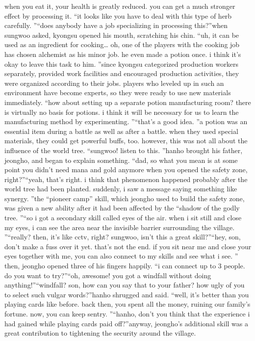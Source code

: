  when you eat it, your health is greatly reduced.
 you can get a much stronger effect by processing it.
“it looks like you have to deal with this type of herb carefully.
”“does anybody have a job specializing in processing this?”when sungwoo asked, kyongsu opened his mouth, scratching his chin.
“uh, it can be used as an ingredient for cooking… oh, one of the players with the cooking job has chosen alchemist as his minor job.
 he even made a potion once.
 i think it’s okay to leave this task to him.
”since kyongsu categorized production workers separately, provided work facilities and encouraged production activities, they were organized according to their jobs.
players who leveled up in such an environment have become experts, so they were ready to use new materials immediately.
“how about setting up a separate potion manufacturing room? there is virtually no basis for potions.
 i think it will be necessary for us to learn the manufacturing method by experimenting.
”“that’s a good idea.
”a potion was an essential item during a battle as well as after a battle.
 when they used special materials, they could get powerful buffs, too.
however, this was not all about the influence of the world tree.
“sungwoo! listen to this.
”hanho brought his father, jeongho, and began to explain something.
“dad, so what you mean is at some point you didn’t need mana and gold anymore when you opened the safety zone, right?”“yeah, that’s right.
 i think that phenomenon happened probably after the world tree had been planted.
 suddenly, i saw a message saying something like synergy.
”the “pioneer camp” skill, which jeongho used to build the safety zone, was given a new ability after it had been affected by the “shadow of the godly tree.
”“so i got a secondary skill called eyes of the air.
 when i sit still and close my eyes, i can see the area near the invisible barrier surrounding the village.
”“really? then, it’s like cctv, right? sungwoo, isn’t this a great skill?”“hey, son, don’t make a fuss over it yet.
 that’s not the end.
 if you sit near me and close your eyes together with me, you can also connect to my skills and see what i see.
”
then, jeongho opened three of his fingers happily.
“i can connect up to 3 people.
 do you want to try?”“oh, awesome! you got a windfall without doing anything!”“windfall? son, how can you say that to your father? how ugly of you to select such vulgar words?”hanho shrugged and said.
 “well, it’s better than you playing cards like before.
 back then, you spent all the money, ruining our family’s fortune.
 now, you can keep sentry.
”“hanho, don’t you think that the experience i had gained while playing cards paid off?”anyway, jeongho’s additional skill was a great contribution to tightening the security around the village.
